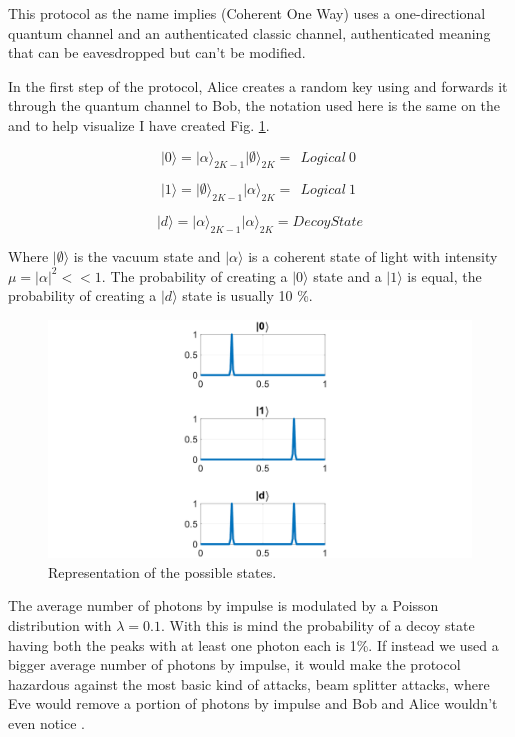 \begin{refsection}
This protocol as the name implies (Coherent One Way) uses a one-directional quantum channel and an authenticated classic channel, authenticated meaning that can be eavesdropped but can't be modified.

In the first step of the protocol, Alice creates a random key using and forwards it through the quantum channel to Bob, the notation used here is the same on the \cite{gisin2004towards} and to help visualize I have created Fig. \ref{fig:sta}.

$$|0\rangle = |\alpha\rangle_{2K-1} |\emptyset\rangle_{2K} =\ \ Logical\ 0\ $$

$$|1\rangle = |\emptyset\rangle_{2K-1} |\alpha\rangle_{2K} =\ \ Logical\ 1\ $$

$$|d\rangle = |\alpha\rangle_{2K-1} |\alpha\rangle_{2K} = Decoy State$$

Where $|\emptyset\rangle$ is the vacuum state and $|\alpha\rangle$ is a coherent state of light with intensity $\mu=|\alpha|^2<<1$.
The probability of creating a $|0\rangle$ state and a $|1\rangle$ is equal, the probability of creating a $|d\rangle$ state is usually 10 \%.

\begin{figure}[hbt!]
\centering
\includegraphics[width=1\linewidth]{./sdf/tq_76558_cow_protocol/slides/figures/S1A.pdf}
\caption{Representation of the possible states.}
\label{fig:sta}
\end{figure}

The average number of photons by impulse is modulated by a Poisson distribution with $\lambda=0.1$. With this is mind the probability of a decoy state having both the peaks with at least one photon each is 1\%. If instead we used a bigger average number of photons by impulse, it would make the protocol hazardous against the most basic kind of attacks, beam splitter attacks, where Eve would remove a portion of photons by impulse and Bob and Alice wouldn't even notice \cite{kronberg2017analysis}.


\end{refsection}
